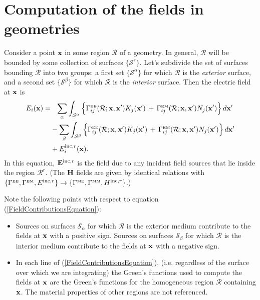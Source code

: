 \documentclass[letterpaper]{article}
\begin{document}
\section{Computation of the fields in \lss geometries}

Consider a point $\mathbf{x}$ in some region $\mathcal{R}$
of a \lss geometry. In general, $\mathcal{R}$
will be bounded by some collection of surfaces
$\{\mathcal{S}^s\}$. Let's subdivide the set of 
surfaces bounding $\mathcal{R}$ into two groups:
a first set $\{\mathcal{S}^\alpha\}$ for which
$\mathcal{R}$ is the \textit{exterior} surface,
and a second set $\{\mathcal{S}^\beta\}$ for which
$\mathcal{R}$ is the \textit{interior} surface.
Then the electric field at $\mathbf{x}$ is
\begin{align} 
E_i(\mathbf{x}) 
    = &\hphantom{-} \sum_\alpha \int_{\mathcal{S}^\alpha} 
           \Big\{ \Gamma_{ij}^{\hbox{\tiny{EE}}}(\mathcal{R}; \mathbf{x}, \mathbf{x}^\prime) 
                   K_j(\mathbf{x}^\prime)
                  \,+\,
                   \Gamma_{ij}^{\hbox{\tiny{EM}}}(\mathcal{R}; \mathbf{x}, \mathbf{x}^\prime) 
                   N_j(\mathbf{x}^\prime)
           \Big\} \, d\mathbf{x}^\prime
\nonumber \\
     &-\sum_\beta \int_{\mathcal{S}^\beta} 
           \Big\{ \Gamma_{ij}^{\hbox{\tiny{EE}}}(\mathcal{R}; \mathbf{x}, \mathbf{x}^\prime) 
                   K_j(\mathbf{x}^\prime)
                  \,+\,
                   \Gamma_{ij}^{\hbox{\tiny{EM}}}(\mathcal{R}; \mathbf{x}, \mathbf{x}^\prime) 
                   N_j(\mathbf{x}^\prime)
           \Big\} \, d\mathbf{x}^\prime
\nonumber \\
     &+E^{\text{\scriptsize inc},r}_i(\mathbf{x}).
\label{FieldContributionsEquation}
\end{align}
In this equation, 
$\mathbf{E}^{\text{\scriptsize inc},r}$ is the field due to any 
incident field sources that lie inside the region $\mathcal{R}^r.$
(The $\mathbf{H}$ fields are given by identical relations with 
$\{ \Gamma^{\hbox{\tiny{EE}}}, \Gamma^{\hbox{\tiny{EM}}}, E^{\text{\scriptsize inc},r}\}  \to 
 \{ \Gamma^{\hbox{\tiny{ME}}}, \Gamma^{\hbox{\tiny{MM}}}, H^{\text{\scriptsize inc},r}\}$.)

Note the following points with respect to equation
(\ref{FieldContributionsEquation}):
\begin{itemize}
  \item Sources on surfaces $\mathcal{S}_\alpha$ for which
        $\mathcal{R}$ is the exterior medium  
        contribute to the fields at $\mathbf{x}$ 
        with a positive sign.
        Sources on surfaces $\mathcal{S}_\beta$ for which
        $\mathcal{R}$ is the interior medium  
        contribute to the fields at $\mathbf{x}$ 
        with a negative sign.

  \item In each line of (\ref{FieldContributionsEquation}), 
        (i.e. regardless of the surface over which we are 
        integrating) the Green's functions used to compute
        the fields at $\mathbf{x}$ are the Green's functions for
        the homogeneous region $\mathcal{R}$ containing $\mathbf{x}$.
        The material properties of other regions are not
        referenced.
\end{itemize}
\end{document}
